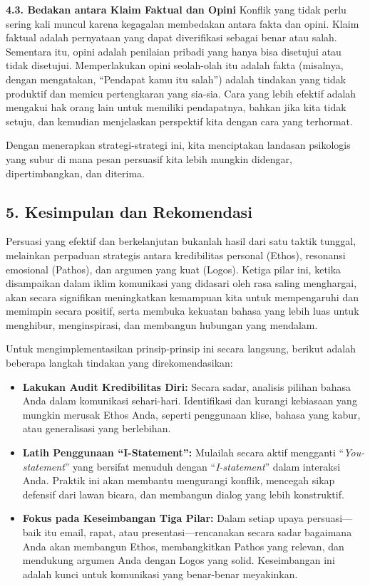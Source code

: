 \documentclass[
  letterpaper,
  DIV=11,
  numbers=noendperiod]{scrreprt}
\begin{document}
\textbf{4.3. Bedakan antara Klaim Faktual dan Opini} Konflik yang tidak
perlu sering kali muncul karena kegagalan membedakan antara fakta dan
opini. Klaim faktual adalah pernyataan yang dapat diverifikasi sebagai
benar atau salah. Sementara itu, opini adalah penilaian pribadi yang
hanya bisa disetujui atau tidak disetujui. Memperlakukan opini
seolah-olah itu adalah fakta (misalnya, dengan mengatakan, ``Pendapat
kamu itu salah'') adalah tindakan yang tidak produktif dan memicu
pertengkaran yang sia-sia. Cara yang lebih efektif adalah mengakui hak
orang lain untuk memiliki pendapatnya, bahkan jika kita tidak setuju,
dan kemudian menjelaskan perspektif kita dengan cara yang terhormat.

Dengan menerapkan strategi-strategi ini, kita menciptakan landasan
psikologis yang subur di mana pesan persuasif kita lebih mungkin
didengar, dipertimbangkan, dan diterima.

\subsection{\texorpdfstring{\textbf{5. Kesimpulan dan
Rekomendasi}}{5. Kesimpulan dan Rekomendasi}}\label{kesimpulan-dan-rekomendasi}

Persuasi yang efektif dan berkelanjutan bukanlah hasil dari satu taktik
tunggal, melainkan perpaduan strategis antara kredibilitas personal
(Ethos), resonansi emosional (Pathos), dan argumen yang kuat (Logos).
Ketiga pilar ini, ketika disampaikan dalam iklim komunikasi yang
didasari oleh rasa saling menghargai, akan secara signifikan
meningkatkan kemampuan kita untuk mempengaruhi dan memimpin secara
positif, serta membuka kekuatan bahasa yang lebih luas untuk menghibur,
menginspirasi, dan membangun hubungan yang mendalam.

Untuk mengimplementasikan prinsip-prinsip ini secara langsung, berikut
adalah beberapa langkah tindakan yang direkomendasikan:

\begin{itemize}
\item
  \textbf{Lakukan Audit Kredibilitas Diri:} Secara sadar, analisis
  pilihan bahasa Anda dalam komunikasi sehari-hari. Identifikasi dan
  kurangi kebiasaan yang mungkin merusak Ethos Anda, seperti penggunaan
  klise, bahasa yang kabur, atau generalisasi yang berlebihan.
\item
  \textbf{Latih Penggunaan ``I-Statement'':} Mulailah secara aktif
  mengganti ``\emph{You-statement}'' yang bersifat menuduh dengan
  ``\emph{I-statement}'' dalam interaksi Anda. Praktik ini akan membantu
  mengurangi konflik, mencegah sikap defensif dari lawan bicara, dan
  membangun dialog yang lebih konstruktif.
\item
  \textbf{Fokus pada Keseimbangan Tiga Pilar:} Dalam setiap upaya
  persuasi---baik itu email, rapat, atau presentasi---rencanakan secara
  sadar bagaimana Anda akan membangun Ethos, membangkitkan Pathos yang
  relevan, dan mendukung argumen Anda dengan Logos yang solid.
  Keseimbangan ini adalah kunci untuk komunikasi yang benar-benar
  meyakinkan.
\end{itemize}
\end{document}
